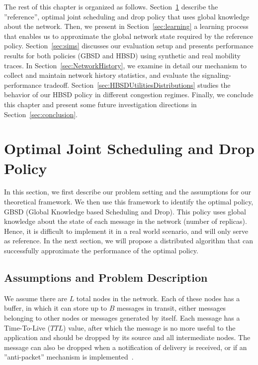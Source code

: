 The rest of this chapter is organized as follows. Section~\ref{sec:optimal-policy} describe the ''reference'', optimal joint scheduling and drop policy that uses global knowledge about the network. Then, we present in Section~\ref{sec:learning} a learning process that enables us to approximate the global network state required by the reference policy. Section~\ref{sec:sims} discusses our evaluation setup and presents performance results for both policies (GBSD and HBSD) using synthetic and real mobility traces. In Section~\ref{sec:NetworkHistory}, we examine in detail our mechanism to collect and maintain network history statistics, and evaluate the signaling-performance tradeoff. Section~\ref{sec:HBSDUtilitiesDistributions} studies the behavior of our HBSD policy in different congestion regimes. Finally, we conclude this chapter and present some future investigation directions in Section~\ref{sec:conclusion}.

\section{Optimal Joint Scheduling and Drop Policy}
\label{sec:optimal-policy}

In this section, we first describe our problem setting and the assumptions for our theoretical framework. We then use this framework to identify the optimal policy, GBSD (Global Knowledge based Scheduling and Drop). This policy uses global knowledge about the state of each message in the network (number of replicas). Hence, it is difficult to implement it in a real world scenario, and will only serve as reference. In the next section, we will propose a distributed algorithm that can successfully approximate the performance of the optimal policy.

\subsection{Assumptions and Problem Description}
\label{subsec:ProblemDescription}

We assume there are $L$ total nodes in the network. Each of these nodes has a buffer, in which it can store up to $B$ messages in transit, either messages belonging to other nodes or messages generated by itself. Each message has a Time-To-Live ($TTL$) value, after which the message is no more useful to the application and should be dropped by its source and all intermediate nodes. The message can also be dropped when a notification of delivery is received, or if an ''anti-packet'' mechanism is implemented~\cite{Towsley:Epidemic}.

